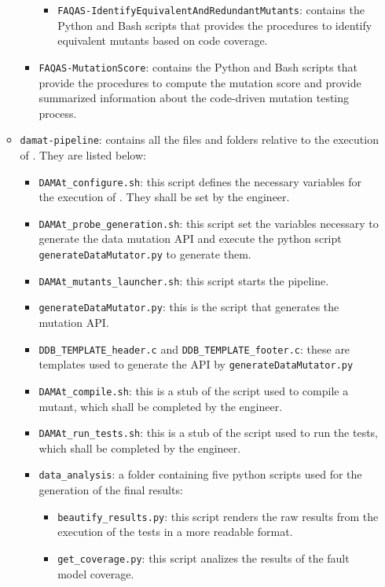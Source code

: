 \begin{itemize}
\begin{itemize}
\begin{itemize}
\begin{itemize}
				\item \texttt{FAQAS-IdentifyEquivalentAndRedundantMutants}: contains the Python and Bash scripts that provides the procedures to identify equivalent mutants based on code coverage.
			\end{itemize}
			\item \texttt{FAQAS-MutationScore}: contains the Python and Bash scripts that provide the procedures to compute the mutation score and provide summarized information about the code-driven mutation testing process.
		\end{itemize}
		\item \texttt{damat-pipeline}: contains all the files and folders relative to the execution of \DAMA. They are listed below:
		\begin{itemize}
			\item \texttt{DAMAt\_configure.sh}: this script defines the necessary variables for the execution of \DAMA. They shall be set by the engineer.
			\item \texttt{DAMAt\_probe\_generation.sh}: this script set the variables necessary to generate the data mutation API and execute the python script \texttt{generateDataMutator.py} to generate them.
			\item \texttt{DAMAt\_mutants\_launcher.sh}: this script starts the \DAMA pipeline.
			\item \texttt{generateDataMutator.py}: this is the script that generates the \DAMA mutation API.
			\item \texttt{DDB\_TEMPLATE\_header.c} and \texttt{DDB\_TEMPLATE\_footer.c}: these are templates used to generate the \DAMA API by \texttt{generateDataMutator.py}
			\item \texttt{DAMAt\_compile.sh}: this is a stub of the script used to compile a mutant, which shall be completed by the engineer.
			\item \texttt{DAMAt\_run\_tests.sh}: this is a stub of the script used to run the tests, which shall be completed by the engineer.
			\item \texttt{data\_analysis}: a folder containing five python scripts used for the generation of the final results:
			\begin{itemize}
				\item \texttt{beautify\_results.py}: this script renders the raw results from the execution of the tests in a more readable format.
				\item \texttt{get\_coverage.py}: this script analizes the results of the fault model coverage.

\end{itemize}
\end{itemize}
\end{itemize}
\end{itemize}
